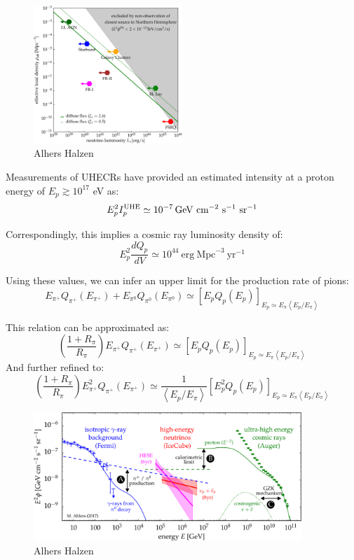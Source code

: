 \begin{figure}[!t]
\centering
\includegraphics[width=0.5\textwidth]{figures/luminosityDISCOVERY.pdf}
\caption{Alhers Halzen~\cite{Ahlers2018ppnp}}
\end{figure}

Measurements of UHECRs have provided an estimated intensity at a proton energy of \(E_p \gtrsim 10^{17}\) eV as:
%
\[ 
E_p^2 I^{\rm UHE}_p \simeq 10^{-7} \, \text{GeV}~\text{cm}^{-2}~\text{s}^{-1}~\text{sr}^{-1} 
\]

Correspondingly, this implies a cosmic ray luminosity density of:
%
\[ 
E_p^2 \frac{dQ_p}{dV} \simeq 10^{44}~\text{erg}~\text{Mpc}^{-3}~\text{yr}^{-1} 
\]

Using these values, we can infer an upper limit for the production rate of pions:
%
\[
E_{\pi^+} Q_{\pi^+} (E_{\pi^+}) + E_{\pi^0} Q_{\pi^0}(E_{\pi^0}) \simeq \left[E_p Q_p(E_p) \right]_{E_p \simeq E_{\pi} \left\langle {E_p}/{E_{\pi}} \right\rangle}
\]

This relation can be approximated as:
\[
\left(\frac{1 + R_{\pi}}{R_{\pi}} \right) E_{\pi^+} Q_{\pi^+} (E_{\pi^+}) \simeq \left[E_p Q_p(E_p) \right]_{E_p \simeq E_{\pi} \left\langle {E_p}/{E_{\pi}} \right\rangle}
\]
And further refined to:
\[
\left(\frac{1 + R_{\pi}}{R_{\pi}} \right) E^2_{\pi^+} Q_{\pi^+} (E_{\pi^+}) \simeq \frac{1}{\left\langle {E_p}/{E_{\pi}} \right\rangle} \left[E^2_p Q_p(E_p) \right]_{E_p \simeq E_{\pi} \left\langle {E_p}/{E_{\pi}} \right\rangle}
\]

\begin{figure}[!t]
\centering
\includegraphics[width=0.90\textwidth]{figures/panorama.pdf}
\caption{Alhers Halzen~\cite{Ahlers2018ppnp}}
\end{figure}

